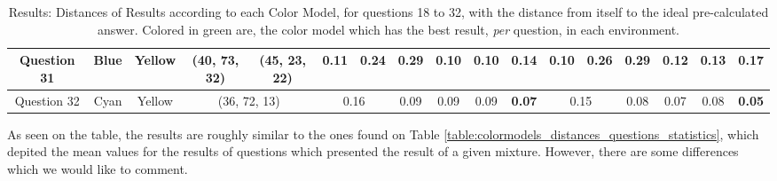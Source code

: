 \begin{table}[!htbp]
{\begin{tabular}{@{}cccccclccccclcccc@{}}
    \multicolumn{1}{c|}{Question 31} & \multicolumn{1}{c|}{Blue}    & \multicolumn{1}{c|}{Yellow}  & \multicolumn{1}{c||}{\cellcolor[HTML]{00FF80}(40, 73, 32)} & \multicolumn{1}{c||}{\cellcolor[HTML]{FF007F}(45, 23, 22)} & \multicolumn{1}{c|}{0.11}    & \multicolumn{1}{l|}{0.24}   & \multicolumn{1}{c|}{0.29}                                  & \multicolumn{1}{c|}{\cellcolor[HTML]{32CB00}\textbf{0.10}}                                  & \multicolumn{1}{c|}{\cellcolor[HTML]{32CB00}\textbf{0.10}}                                  & \multicolumn{1}{c||}{0.14}                                  & \multicolumn{1}{c|}{\cellcolor[HTML]{32CB00}\textbf{0.10}}    & \multicolumn{1}{l|}{0.26}   & \multicolumn{1}{c|}{0.29}                                  & \multicolumn{1}{c|}{0.12}                                  & \multicolumn{1}{c|}{0.13}                                  & \multicolumn{1}{c|}{0.17}                                  \\ \midrule
    \multicolumn{1}{c|}{Question 32} & \multicolumn{1}{c|}{Cyan}    & \multicolumn{1}{c|}{Yellow}  & \multicolumn{2}{c||}{\cellcolor[HTML]{00FF00}(36, 72, 13)}                                                             & \multicolumn{2}{c|}{0.16}                                  & \multicolumn{1}{c|}{0.09}                                  & \multicolumn{1}{c|}{0.09}                                  & \multicolumn{1}{c|}{0.09}                                  & \multicolumn{1}{c||}{\cellcolor[HTML]{32CB00}\textbf{0.07}} & \multicolumn{2}{c|}{0.15}                                  & \multicolumn{1}{c|}{0.08}                                  & \multicolumn{1}{c|}{0.07}                                  & \multicolumn{1}{c|}{0.08}                                  & \multicolumn{1}{c|}{\cellcolor[HTML]{32CB00}\textbf{0.05}} \\ \bottomrule
  \end{tabular}}
  \caption[Results: Distances of Results according to each Color Model, for questions 18 to 32.]{Results: Distances of Results according to each Color Model, for questions 18 to 32, with the distance from itself to the ideal pre-calculated answer. Colored
  in green are, the color model which has the best result, \emph{per} question, in each environment.}
  \label{table:expectation_distances_labonline}
\end{table}
%
As seen on the table, the results are roughly similar to the ones found on Table \ref{table:colormodels_distances_questions_statistics}, which depited the mean values for the results of questions which
presented the result of a given mixture. However, there are some differences which we would like to comment. \par
